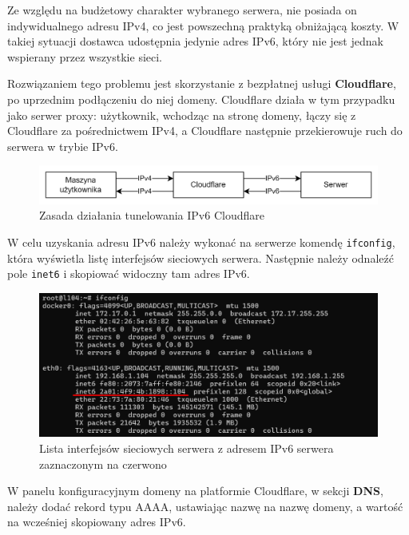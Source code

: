 \documentclass{article}
\begin{document}
Ze względu na budżetowy charakter wybranego serwera, nie posiada on indywidualnego adresu IPv4, co jest powszechną praktyką obniżającą koszty. W takiej sytuacji dostawca udostępnia jedynie adres IPv6, który nie jest jednak wspierany przez wszystkie sieci.

Rozwiązaniem tego problemu jest skorzystanie z bezpłatnej usługi \textbf{Cloudflare}, po uprzednim podłączeniu do niej domeny. Cloudflare działa w tym przypadku jako serwer proxy: użytkownik, wchodząc na stronę domeny, łączy się z Cloudflare za pośrednictwem IPv4, a Cloudflare następnie przekierowuje ruch do serwera w trybie IPv6.

\begin{figure}[H]
    \centering
    \includegraphics[width=1\linewidth]{ipv6diagram.png}
    \caption{Zasada działania tunelowania IPv6 Cloudflare}
    \label{fig:enter-label}
\end{figure}

W celu uzyskania adresu IPv6 należy wykonać na serwerze komendę \lstinline|ifconfig|, która wyświetla listę interfejsów sieciowych serwera. Następnie należy odnaleźć pole \lstinline|inet6| i skopiować widoczny tam adres IPv6.

\begin{figure}[H]
    \centering
    \includegraphics[width=1\linewidth]{ipv6server.png}
    \caption{Lista interfejsów sieciowych serwera z adresem IPv6 serwera zaznaczonym na czerwono}
    \label{fig:enter-label}
\end{figure}

W panelu konfiguracyjnym domeny na platformie Cloudflare, w sekcji \textbf{DNS}, należy dodać rekord typu AAAA, ustawiając nazwę na nazwę domeny, a wartość na wcześniej skopiowany adres IPv6.
\end{document}
